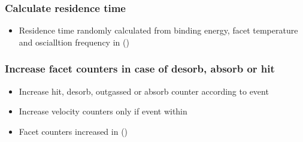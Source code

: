 \subsubsection{Calculate residence time}
\begin{itemize}[noitemsep,topsep=0pt, partopsep=0pt]
\item Residence time randomly calculated from binding energy, facet temperature and oscialltion frequency in   ()
\end{itemize}

\subsubsection{Increase facet counters in case of desorb, absorb or hit}
\begin{itemize}[noitemsep,topsep=0pt, partopsep=0pt]
\item Increase hit, desorb, outgassed or absorb counter according to event
\item Increase velocity counters only if event within 
\item Facet counters increased in   ()
\end{itemize}


